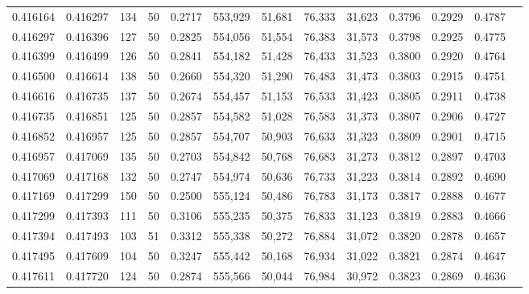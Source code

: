 \begin{tabular}{rrrrrrrrrrrrr}
0.416164 & 0.416297 &   134 &  50 &                                     0.2717 & 553,929 &  51,681 &  76,333 &  31,623 & 0.3796 & 0.2929 & 0.4787 \\
0.416297 & 0.416396 &   127 &  50 &                                     0.2825 & 554,056 &  51,554 &  76,383 &  31,573 & 0.3798 & 0.2925 & 0.4775 \\
0.416399 & 0.416499 &   126 &  50 &                                     0.2841 & 554,182 &  51,428 &  76,433 &  31,523 & 0.3800 & 0.2920 & 0.4764 \\
0.416500 & 0.416614 &   138 &  50 &                                     0.2660 & 554,320 &  51,290 &  76,483 &  31,473 & 0.3803 & 0.2915 & 0.4751 \\
0.416616 & 0.416735 &   137 &  50 &                                     0.2674 & 554,457 &  51,153 &  76,533 &  31,423 & 0.3805 & 0.2911 & 0.4738 \\
0.416735 & 0.416851 &   125 &  50 &                                     0.2857 & 554,582 &  51,028 &  76,583 &  31,373 & 0.3807 & 0.2906 & 0.4727 \\
0.416852 & 0.416957 &   125 &  50 &                                     0.2857 & 554,707 &  50,903 &  76,633 &  31,323 & 0.3809 & 0.2901 & 0.4715 \\
0.416957 & 0.417069 &   135 &  50 &                                     0.2703 & 554,842 &  50,768 &  76,683 &  31,273 & 0.3812 & 0.2897 & 0.4703 \\
0.417069 & 0.417168 &   132 &  50 &                                     0.2747 & 554,974 &  50,636 &  76,733 &  31,223 & 0.3814 & 0.2892 & 0.4690 \\
0.417169 & 0.417299 &   150 &  50 &                                     0.2500 & 555,124 &  50,486 &  76,783 &  31,173 & 0.3817 & 0.2888 & 0.4677 \\
0.417299 & 0.417393 &   111 &  50 &                                     0.3106 & 555,235 &  50,375 &  76,833 &  31,123 & 0.3819 & 0.2883 & 0.4666 \\
0.417394 & 0.417493 &   103 &  51 &                                     0.3312 & 555,338 &  50,272 &  76,884 &  31,072 & 0.3820 & 0.2878 & 0.4657 \\
0.417495 & 0.417609 &   104 &  50 &                                     0.3247 & 555,442 &  50,168 &  76,934 &  31,022 & 0.3821 & 0.2874 & 0.4647 \\
0.417611 & 0.417720 &   124 &  50 &                                     0.2874 & 555,566 &  50,044 &  76,984 &  30,972 & 0.3823 & 0.2869 & 0.4636 \\

\end{tabular}
